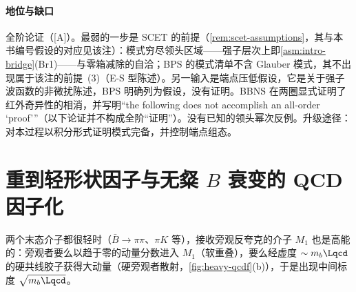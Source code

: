 \paragraph{地位与缺口}
全阶论证（[A]）。最弱的一步是 SCET 的前提（\cref{rem:scet-assumptions}，其与本书编号假设的对应见该注）：模式穷尽领头区域——强子层次上即\cref{asm:intro-bridge}(Br1)——与零箱减除的自洽；BPS 的模式清单不含 Glauber 模式，其不出现属于该注的前提~(3)（E-S 型陈述）。另一输入是端点压低假设，它是关于强子波函数的非微扰陈述，BPS 明确列为假设，没有证明。BBNS 在两圈显式证明了红外奇异性的相消，并写明“the following does not accomplish an all-order ‘proof’”（以下论证并不构成全阶“证明”）\cite[第~5~节]{BenekeEtAl2000}。没有已知的领头幂次反例。升级途径：对本过程以积分形式证明模式完备，并控制端点组态。

\section{重到轻形状因子与无粲 $B$ 衰变的 QCD 因子化}\label{sec:heavy-qcdf}

两个末态介子都很轻时（$\bar B\to\pi\pi$、$\pi K$ 等），接收旁观反夸克的介子 $M_1$ 也是高能的：旁观者要么以趋于零的动量分数进入 $M_1$（软重叠），要么经虚度 $\sim m_b\Lqcd$ 的硬共线胶子获得大动量（硬旁观者散射，\cref{fig:heavy-qcdf}(b)），于是出现中间标度 $\sqrt{m_b\Lqcd}$。

